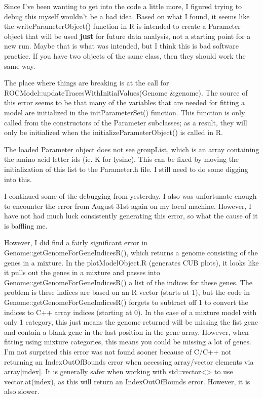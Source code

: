 \documentclass[11pt]{labbook}
\begin{document}

Since I've been wanting to get into the code a little more, I figured trying to debug this myself wouldn't be a bad idea. Based on what I found, it seems like the writeParameterObject() function in R is intended to create a Parameter object that will be used \textbf{just} for future data analysis, not a starting point for a new run. Maybe that is what was intended, but I think this is bad software practice. If you have two objects of the same class, then they should work the same way.

The place where things are breaking is at the call for ROCModel::updateTracesWithInitialValues(Genome \&genome). The source of this error seems to be that many of the variables that are needed for fitting a model are initialized in the initParameterSet() function. This function is only called from the constructors of the Parameter subclasses; as a result, they will only be initialized when the initializeParameterObject() is called in R. 

The loaded Parameter object does not see groupList, which is an array containing the amino acid letter ids (ie. K for lysine). This can be fixed by moving the initialization of this list to the Parameter.h file. I still need to do some digging into this.

I continued some of the debugging from yesterday. I also was unfortunate enough to encounter the error from August 31st again on my local machine. However, I have not had much luck consistently generating this error, so what the cause of it is baffling me. 

However, I did find a fairly significant error in  Genome::getGenomeForGeneIndicesR(), which returns a genome consisting of the genes in a mixture. In the plotModelObject.R (generates CUB plots), it looks like it pulls out the genes in a mixture and passes into Genome::getGenomeForGeneIndicesR() a list of the indices for these genes. The problem is these indices are based on an R vector (starts at 1), but the code in Genome::getGenomeForGeneIndicesR() forgets to subtract off 1 to convert the indices to C++ array indices (starting at 0). In the case of a mixture model with only 1 category, this just means the genome returned will be missing the fist gene and contain a blank gene in the last position in the gene array. However, when fitting using mixture categories, this means you could be missing a lot of genes. I'm not surprised this error was not found sooner because of C/C++ not returning an IndexOutOfBounds error when accessing array/vector elements via array[index]. It is generally safer when working with std::vector<> to use vector.at(index), as this will return an IndexOutOfBounds error. However, it is also slower. 
\end{document}
